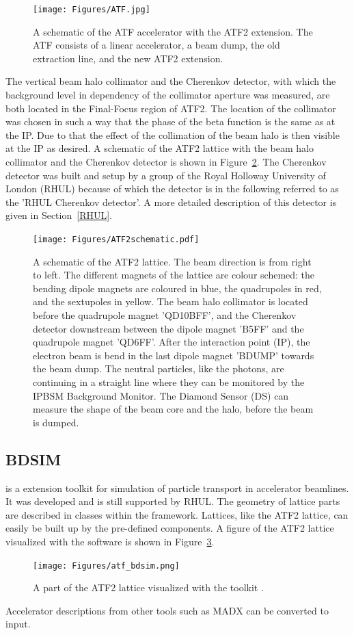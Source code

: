 \begin{figure}
\centering
\texttt{[image: Figures/ATF.jpg]}
\caption[ATF accelerator]{A schematic of the ATF accelerator with the ATF2 extension. The ATF consists of a linear accelerator, a beam dump, the old extraction line, and the new ATF2 extension.}%
\label{fig:ATF}
\end{figure}

The vertical beam halo collimator and the Cherenkov detector, with which the background level in dependency of the collimator aperture was measured, are both located in the Final-Focus region of ATF2. The location of the collimator was chosen in such a way that the phase of the beta function is the same as at the IP. Due to that the effect of the collimation of the beam halo is then visible at the IP as desired. A schematic of the ATF2 lattice with the beam halo collimator and the Cherenkov detector is shown in Figure~\ref{fig:ATF2}. The Cherenkov detector was built and setup by a group of the Royal Holloway University of London (RHUL) because of which the detector is in the following referred to as the 'RHUL Cherenkov detector'. A more detailed description of this detector is given in Section~\ref{RHUL}.

\begin{figure}
\centering
\texttt{[image: Figures/ATF2schematic.pdf]}
\caption[ATF2]{A schematic of the ATF2 lattice. The beam direction is from right to left. The different magnets of the lattice are colour schemed: the bending dipole magnets are coloured in blue, the quadrupoles in red, and the sextupoles in yellow. The beam halo collimator is located before the quadrupole magnet 'QD10BFF', and the Cherenkov detector downstream between the dipole magnet 'B5FF' and the quadrupole magnet 'QD6FF'. After the interaction point (IP), the electron beam is bend in the last dipole magnet 'BDUMP' towards the beam dump. The neutral particles, like the photons, are continuing in a straight line where they can be monitored by the IPBSM Background Monitor. The Diamond Sensor (DS) can measure the shape of the beam core and the halo, before the beam is dumped.}
\label{fig:ATF2}
\end{figure}

\subsection{BDSIM}
\label{BDSIM}
\bdsim is a \geant extension toolkit for simulation of particle transport in accelerator beamlines. It was developed and is still supported by RHUL.
The geometry of lattice parts are described in classes within the \bdsim framework. Lattices, like the ATF2 lattice, can easily be built up by the pre-defined components. A figure of the ATF2 lattice visualized with the \bdsim software is shown in Figure~\ref{fig:ATF2_BDSIM}.
\begin{figure}
\centering
\texttt{[image: Figures/atf\_bdsim.png]} %
\caption[ATF2 lattice in \bdsim]{A part of the ATF2 lattice visualized with the \geant toolkit \bdsim.}
\label{fig:ATF2_BDSIM}
\end{figure}
Accelerator descriptions from other tools such as MADX can be converted to \bdsim input. 

